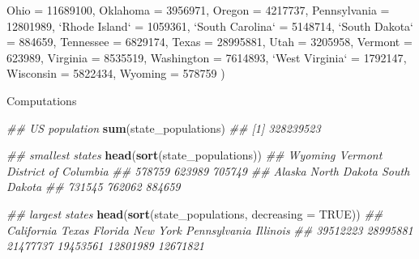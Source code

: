 \documentclass[
]{book}
\newenvironment{Shaded}{\begin{snugshade}}{\end{snugshade}}
\newcommand{\CommentTok}[1]{\textcolor[rgb]{0.56,0.35,0.01}{\textit{#1}}}
\newcommand{\DataTypeTok}[1]{\textcolor[rgb]{0.13,0.29,0.53}{#1}}
\newcommand{\DecValTok}[1]{\textcolor[rgb]{0.00,0.00,0.81}{#1}}
\newcommand{\KeywordTok}[1]{\textcolor[rgb]{0.13,0.29,0.53}{\textbf{#1}}}
\newcommand{\NormalTok}[1]{#1}
\newcommand{\OtherTok}[1]{\textcolor[rgb]{0.56,0.35,0.01}{#1}}
\newcommand{\StringTok}[1]{\textcolor[rgb]{0.31,0.60,0.02}{#1}}
\begin{document}
\begin{itemize}
\begin{Shaded}
\begin{Highlighting}[]
    \DataTypeTok{Ohio =} \DecValTok{11689100}\NormalTok{, }\DataTypeTok{Oklahoma =} \DecValTok{3956971}\NormalTok{, }\DataTypeTok{Oregon =} \DecValTok{4217737}\NormalTok{, }\DataTypeTok{Pennsylvania =} \DecValTok{12801989}\NormalTok{,}
    \StringTok{`}\DataTypeTok{Rhode Island}\StringTok{`}\NormalTok{ =}\StringTok{ }\DecValTok{1059361}\NormalTok{, }\StringTok{`}\DataTypeTok{South Carolina}\StringTok{`}\NormalTok{ =}\StringTok{ }\DecValTok{5148714}\NormalTok{, }\StringTok{`}\DataTypeTok{South Dakota}\StringTok{`}\NormalTok{ =}\StringTok{ }\DecValTok{884659}\NormalTok{,}
    \DataTypeTok{Tennessee =} \DecValTok{6829174}\NormalTok{, }\DataTypeTok{Texas =} \DecValTok{28995881}\NormalTok{, }\DataTypeTok{Utah =} \DecValTok{3205958}\NormalTok{, }\DataTypeTok{Vermont =} \DecValTok{623989}\NormalTok{,}
    \DataTypeTok{Virginia =} \DecValTok{8535519}\NormalTok{, }\DataTypeTok{Washington =} \DecValTok{7614893}\NormalTok{, }\StringTok{`}\DataTypeTok{West Virginia}\StringTok{`}\NormalTok{ =}\StringTok{ }\DecValTok{1792147}\NormalTok{,}
    \DataTypeTok{Wisconsin =} \DecValTok{5822434}\NormalTok{, }\DataTypeTok{Wyoming =} \DecValTok{578759}
\NormalTok{)}
\end{Highlighting}
\end{Shaded}

  Computations

\begin{Shaded}
\begin{Highlighting}[]
\CommentTok{## US population}
\KeywordTok{sum}\NormalTok{(state_populations)}
\CommentTok{## [1] 328239523}

\CommentTok{## smallest states}
\KeywordTok{head}\NormalTok{(}\KeywordTok{sort}\NormalTok{(state_populations))}
\CommentTok{##              Wyoming              Vermont District of Columbia }
\CommentTok{##               578759               623989               705749 }
\CommentTok{##               Alaska         North Dakota         South Dakota }
\CommentTok{##               731545               762062               884659}

\CommentTok{## largest states}
\KeywordTok{head}\NormalTok{(}\KeywordTok{sort}\NormalTok{(state_populations, }\DataTypeTok{decreasing =} \OtherTok{TRUE}\NormalTok{))}
\CommentTok{##   California        Texas      Florida     New York Pennsylvania     Illinois }
\CommentTok{##     39512223     28995881     21477737     19453561     12801989     12671821}


\end{Highlighting}
\end{Shaded}
\end{itemize}
\end{document}
